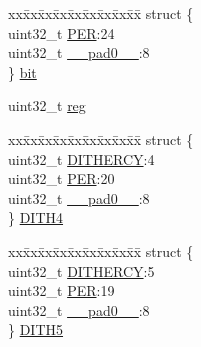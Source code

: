 \begin{DoxyCompactItemize}
\begin{tabbing}
\end{tabbing}\item 
\begin{tabbing}
xx\=xx\=xx\=xx\=xx\=xx\=xx\=xx\=xx\=\kill
struct \{\\
\>uint32\_t \mbox{\hyperlink{union_t_c_c___p_e_r___type_a3a85cb8e507302b97a36eaf1c13d0b72}{PER}}:24\\
\>uint32\_t \mbox{\hyperlink{union_t_c_c___p_e_r___type_a3e57c2ef1c3ffb36722f000cc1156824}{\_\_pad0\_\_}}:8\\
\} \mbox{\hyperlink{union_t_c_c___p_e_r___type_aa242d9c894154defbbbb26c7b1dce5bf}{bit}}\\

\end{tabbing}\item 
uint32\+\_\+t \mbox{\hyperlink{union_t_c_c___p_e_r___type_a6b91636401516a477989a336376d7b40}{reg}}
\item 
\begin{tabbing}
xx\=xx\=xx\=xx\=xx\=xx\=xx\=xx\=xx\=\kill
struct \{\\
\>uint32\_t \mbox{\hyperlink{union_t_c_c___p_e_r___type_a1e7fc84641e39de898f29ee9268f22aa}{DITHERCY}}:4\\
\>uint32\_t \mbox{\hyperlink{union_t_c_c___p_e_r___type_a3a85cb8e507302b97a36eaf1c13d0b72}{PER}}:20\\
\>uint32\_t \mbox{\hyperlink{union_t_c_c___p_e_r___type_a3e57c2ef1c3ffb36722f000cc1156824}{\_\_pad0\_\_}}:8\\
\} \mbox{\hyperlink{union_t_c_c___p_e_r___type_a4cb2faefb43aab4a4e8869428c68787f}{DITH4}}\\

\end{tabbing}\item 
\begin{tabbing}
xx\=xx\=xx\=xx\=xx\=xx\=xx\=xx\=xx\=\kill
struct \{\\
\>uint32\_t \mbox{\hyperlink{union_t_c_c___p_e_r___type_a1e7fc84641e39de898f29ee9268f22aa}{DITHERCY}}:5\\
\>uint32\_t \mbox{\hyperlink{union_t_c_c___p_e_r___type_a3a85cb8e507302b97a36eaf1c13d0b72}{PER}}:19\\
\>uint32\_t \mbox{\hyperlink{union_t_c_c___p_e_r___type_a3e57c2ef1c3ffb36722f000cc1156824}{\_\_pad0\_\_}}:8\\
\} \mbox{\hyperlink{union_t_c_c___p_e_r___type_a9e5525a190c1b664ff4ae1cba3b25150}{DITH5}}\\


\end{tabbing}
\end{DoxyCompactItemize}
